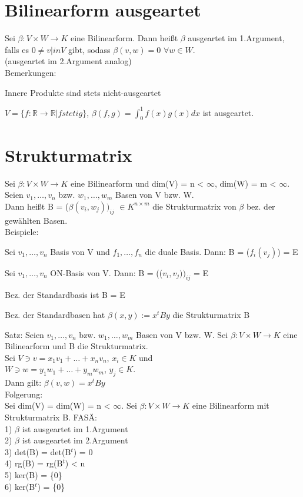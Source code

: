 \documentclass[fontsize=10pt]{scrartcl}
\begin{document}
\section{Bilinearform ausgeartet}
Sei $\beta: V \times W \to K$ eine Bilinearform. Dann heißt $\beta$ ausgeartet im 1.Argument, falls es $0 \neq v |in V$ gibt, sodass $\beta(v,w) = 0$ $\forall w \in W$.\\
(ausgeartet im 2.Argument analog)\\
Bemerkungen:
\begin{compactitem}
\item Innere Produkte sind stets nicht-ausgeartet
\item $V = \{ f: \mathbb{R} \to \mathbb{R} | f stetig \}$, $\beta(f,g) = \displaystyle\int_0^1 f(x) g(x) dx$ ist ausgeartet.
\end{compactitem}

\section{Strukturmatrix}
Sei $\beta: V \times W \to K$ eine Bilinearform und dim(V) = n < $\infty$, dim(W) = m < $\infty$. Seien $v_1, …, v_n$ bzw. $w_1, …, w_m$ Basen von V bzw. W.\\
Dann heißt B = ($\beta(v_i, w_j))_{ij}$ $\in K^{n \times m}$ die Strukturmatrix von $\beta$ bez. der gewählten Basen.\\
Beispiele:
\begin{compactitem}
\item Sei $v_1, …, v_n$ Basis von V und $f_1, …, f_n$ die duale Basis. Dann: B = ($f_i(v_j)$) = E
\item Sei $v_1, …, v_n$ ON-Basis von V. Dann: B = (($v_i, v_j))_{ij}$ = E
\item Bez. der Standardbasis ist B = E
\item Bez. der Standardbasen hat $\beta(x,y) := x^tBy$ die Strukturmatrix B
\end{compactitem}
Satz: Seien $v_1, …, v_n$ bzw. $w_1, …, w_m$ Basen von V bzw. W. Sei $\beta: V \times W \to K$ eine Bilinearform und B die Strukturmatrix.\\
Sei $V \ni v = x_1v_1 + … + x_nv_n$, $x_i \in K$ und\\
\hspace*{10mm} $W \ni w = y_1w_1 + … + y_mw_m$, $y_j \in K$.\\
Dann gilt: $\beta(v, w) = x^tBy$\\
Folgerung:\\
Sei dim(V) = dim(W) = n < $\infty$. Sei $\beta: V \times W \to K$ eine Bilinearform mit Strukturmatrix B. FASÄ:\\
1) $\beta$ ist ausgeartet im 1.Argument\\
2) $\beta$ ist ausgeartet im 2.Argument\\
3) det(B) = det(B$^t$) = 0\\
4) rg(B) = rg(B$^t$) < n\\
5) ker(B) = \{0\}\\
6) ker(B$^t$) = \{0\}\\
\end{document}
